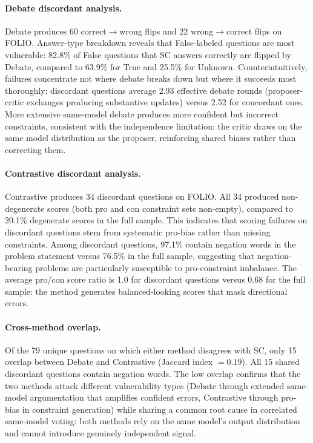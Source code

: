 \paragraph{Debate discordant analysis.} Debate produces 60 correct$\to$wrong flips and 22 wrong$\to$correct flips on FOLIO. Answer-type breakdown reveals that False-labeled questions are most vulnerable: 82.8\% of False questions that SC answers correctly are flipped by Debate, compared to 63.9\% for True and 25.5\% for Unknown. Counterintuitively, failures concentrate not where debate breaks down but where it succeeds most thoroughly: discordant questions average 2.93 effective debate rounds (proposer-critic exchanges producing substantive updates) versus 2.52 for concordant ones. More extensive same-model debate produces more confident but incorrect constraints, consistent with the independence limitation: the critic draws on the same model distribution as the proposer, reinforcing shared biases rather than correcting them.

\paragraph{Contrastive discordant analysis.} Contrastive produces 34 discordant questions on FOLIO. All 34 produced non-degenerate scores (both pro and con constraint sets non-empty), compared to 20.1\% degenerate scores in the full sample. This indicates that scoring failures on discordant questions stem from systematic pro-bias rather than missing constraints. Among discordant questions, 97.1\% contain negation words in the problem statement versus 76.5\% in the full sample, suggesting that negation-bearing problems are particularly susceptible to pro-constraint imbalance. The average pro/con score ratio is 1.0 for discordant questions versus 0.68 for the full sample: the method generates balanced-looking scores that mask directional errors.

\paragraph{Cross-method overlap.} Of the 79 unique questions on which either method disagrees with SC, only 15 overlap between Debate and Contrastive (Jaccard index $= 0.19$). All 15 shared discordant questions contain negation words. The low overlap confirms that the two methods attack different vulnerability types (Debate through extended same-model argumentation that amplifies confident errors, Contrastive through pro-bias in constraint generation) while sharing a common root cause in correlated same-model voting: both methods rely on the same model's output distribution and cannot introduce genuinely independent signal.


